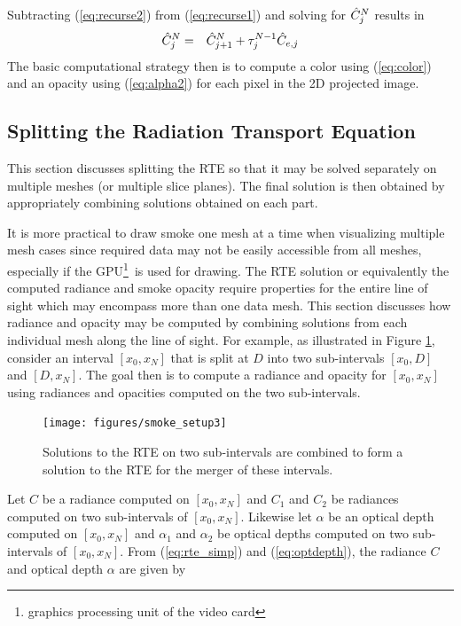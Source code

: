 Subtracting (\ref{eq:recurse2}) from (\ref{eq:recurse1}) and solving for $\hat{C}_{j}^N$ results in
\begin{eqnarray}
\label{eq:color}
\hat{C}_{j}^N&=&\hat{C}_{j+1}^N+\tau_{j}^{N-1}\hat{C}_{e,j}
\end{eqnarray}
The basic computational strategy then is to compute a color using (\ref{eq:color}) and an opacity using (\ref{eq:alpha2}) for each pixel in the 2D projected image.


\subsection{Splitting the Radiation Transport Equation}
This section discusses splitting the RTE so that it may be solved separately on multiple meshes (or multiple slice planes).  The final solution is then obtained by  appropriately combining solutions obtained on each part.

It is more practical to draw smoke one mesh at a time when visualizing multiple mesh cases since required data may not be easily accessible from all meshes, especially if the GPU\footnote{graphics processing unit of the video card}\ is used for drawing.  The RTE solution or equivalently the computed radiance and smoke opacity require  properties for the entire line of sight which may encompass more than one data mesh.  This section discusses how  radiance and opacity may be computed by combining solutions from each individual mesh along the line of sight.  For example, as illustrated in Figure \ref{figsmokesetup3}, consider an interval $[x_0,x_N]$ that is split at $D$ into two sub-intervals $[x_0,D]$ and $[D,x_N]$.  The goal then is to compute a radiance and opacity for $[x_0,x_N]$ using radiances and opacities computed on  the two sub-intervals.

\begin{figure}[\figoptions]
\begin{center}
\texttt{[image: figures/smoke\_setup3]}
\end{center}
\caption {Solutions to the RTE on two sub-intervals are combined to form a solution to the RTE
for the merger of these intervals.}
\label{figsmokesetup3}
\end{figure}

Let $C$ be a radiance computed on $[x_0,x_N]$ and $C_1$ and $C_2$ be radiances computed on two sub-intervals of $[x_0,x_N]$.  Likewise let $\alpha$ be an optical depth computed on $[x_0,x_N]$ and $\alpha_1$ and $\alpha_2$ be optical depths computed on two sub-intervals of $[x_0,x_N]$.
From (\ref{eq:rte_simp}) and (\ref{eq:optdepth}), the radiance $C$ and optical depth $\alpha$ are given by


